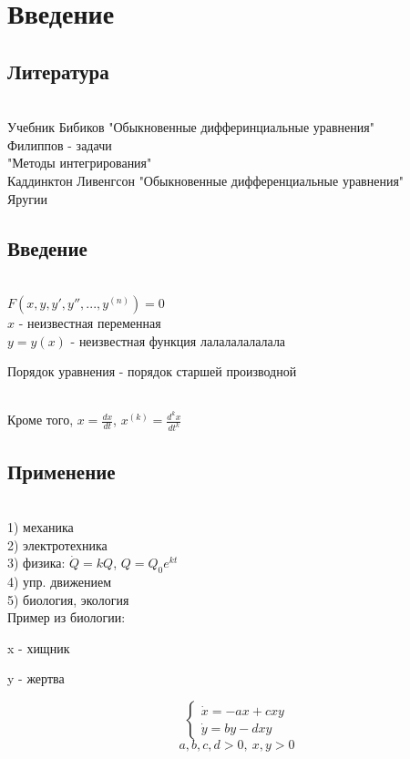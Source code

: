 \documentclass[main, 12pt, fleqn]{subfiles}
\begin{document}
\section{Введение}
\subsection{Литература}\ \\
Учебник Бибиков "Обыкновенные дифферинциальные уравнения"\\
Филиппов - задачи\\
"Методы интегрирования"\\
Каддинктон Ливенгсон "Обыкновенные дифференциальные уравнения"\\
Яругии
\\
\subsection{Введение}\ \\
$F(x,y,y',y'',...,y^{(n)})=0$\\
$x$ - неизвестная переменная\\
$y=y(x)$ - неизвестная функция лалалалалалала

\begin{definition}
Порядок уравнения - порядок старшей производной
\end{definition}
\\
Кроме того, $x= \frac{dx}{dt}$, $x^{(k)}= \frac{d^k x}{dt^k}$
\\
\subsection{Применение}\ \\
1) механика\\
2) электротехника\\
3) физика: $\dot{Q}=k Q$, $Q=Q_0 e^{kt}$\\
4) упр. движением\\
5) биология, экология\\
Пример из биологии:

x - хищник

y - жертва

\begin{equation*}
 \begin{cases}
   \dot{x} = -ax+cxy\\
   \dot{y}=by-dxy
 \end{cases}
\end{equation*}
$$a,b,c,d > 0,\ x,y>0$$
\end{document}
